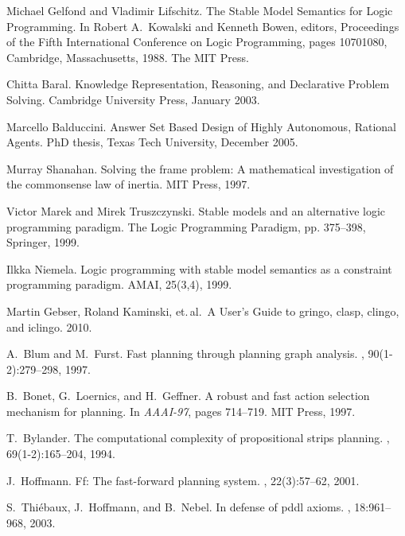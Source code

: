 \documentclass{article}
\begin{document}
\begin{thebibliography}{2}

Michael Gelfond and Vladimir Lifschitz.
The Stable Model Semantics for Logic Programming.
In Robert A.\, Kowalski and Kenneth Bowen, editors, Proceedings of the Fifth International Conference on Logic Programming, pages 1070{1080}, Cambridge, Massachusetts, 1988.
The MIT Press.

Chitta Baral.
Knowledge Representation, Reasoning, and Declarative Problem Solving.
Cambridge University Press, January 2003.

Marcello Balduccini.
Answer Set Based Design of Highly Autonomous, Rational Agents.
PhD thesis, Texas Tech University, December 2005.

Murray Shanahan.
Solving the frame problem: A mathematical investigation of the commonsense law of inertia.
MIT Press, 1997.

Victor Marek and Mirek Truszczynski.
Stable models and an alternative logic programming paradigm.
The Logic Programming Paradigm, pp. 375–398, Springer, 1999.

Ilkka Niemela.
Logic programming with stable model semantics as a constraint programming paradigm.
AMAI, 25(3,4), 1999.

Martin Gebser, Roland Kaminski, et.\,al.\,
A User's Guide to gringo, clasp, clingo, and iclingo.
2010.

A.~Blum and M.~Furst.
\newblock Fast planning through planning graph analysis.
, 90(1-2):279--298, 1997.

B.~Bonet, G.~Loernics, and H.~Geffner.
\newblock A robust and fast action selection mechanism for planning.
\newblock In {\em AAAI-97}, pages 714--719. MIT Press, 1997.

T.~Bylander.
\newblock The computational complexity of propositional strips planning.
, 69(1-2):165--204, 1994.

J.~Hoffmann.
\newblock Ff: The fast-forward planning system.
, 22(3):57--62, 2001.

S.~Thi{\'e}baux, J.~Hoffmann, and B.~Nebel.
\newblock In defense of pddl axioms.
, 18:961--968, 2003.


\end{thebibliography}
\end{document}
